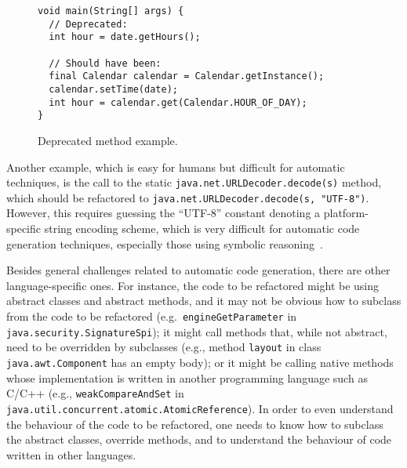 \documentclass[sigconf,review,anonymous]{acmart}
\begin{document}
\begin{figure}[ht]
\begin{lstlisting}[mathescape=true,showstringspaces=false]
void main(String[] args) {
  // Deprecated:
  int hour = date.getHours();
  
  // Should have been:
  final Calendar calendar = Calendar.getInstance();
  calendar.setTime(date);
  int hour = calendar.get(Calendar.HOUR_OF_DAY);
}
\end{lstlisting}
\caption{Deprecated method example.}
\label{ex:deprecated-method-other}
\end{figure}

Another example, which is easy for humans but difficult for automatic techniques, is the call to the static \lstinline[breaklines=true]{java.net.URLDecoder.decode(s)} method, which should be refactored to \lstinline[breaklines=true]{java.net.URLDecoder.decode(s, "UTF-8")}.
However, this requires guessing the ``UTF-8'' constant denoting a platform-specific
string encoding scheme, which is very difficult for automatic code generation techniques, especially those using symbolic reasoning~\cite{DBLP:conf/cav/AbateDKKP18}.


Besides general challenges related to automatic code generation, there are other language-specific ones. For instance, the code to be refactored might be using abstract classes and abstract methods, and it may not be obvious how to subclass from the code to be refactored (e.g.~\lstinline[breaklines=true]{engineGetParameter} in \lstinline[breaklines=true]{java.security.SignatureSpi}); it might call methods that, while not abstract, need to be overridden by subclasses (e.g., method \lstinline[breaklines=true]{layout} in class \lstinline[breaklines=true]{java.awt.Component} has an empty body); or it might be calling native methods whose implementation is written in another programming language such as C/C++ (e.g., \lstinline[breaklines=true]{weakCompareAndSet} in \lstinline[breaklines=true]{java.util.concurrent.atomic.AtomicReference}). In order to even understand the behaviour of the code to be refactored, one needs to know how to subclass the abstract classes, override methods, and to understand the behaviour of code written in other languages.
\end{document}

